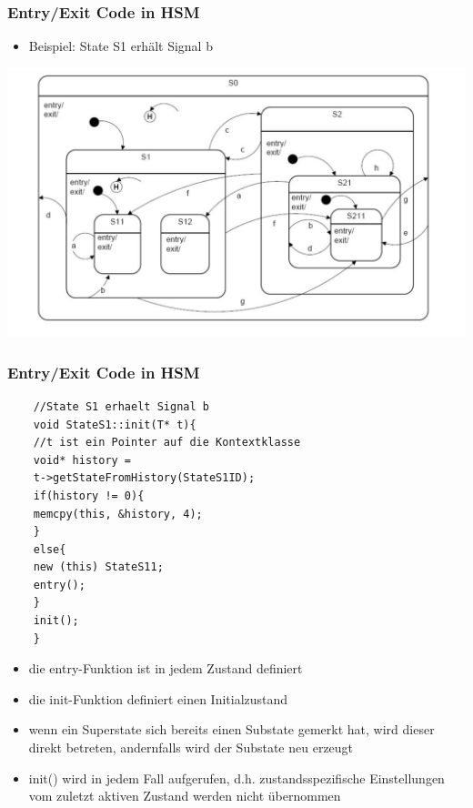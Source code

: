 \documentclass{beamer}
\begin{document}
\begin{frame}
	\frametitle{Entry/Exit Code in HSM  }
	\begin{itemize}
		\item Beispiel: State S1 erh\"alt Signal b
	\end{itemize}
	\includegraphics[scale=.3]{img/beispiel_automat}
\end{frame}

\begin{frame}[fragile]
	\frametitle{Entry/Exit Code in HSM }
	\begin{lstlisting}
	//State S1 erhaelt Signal b
	void StateS1::init(T* t){
	//t ist ein Pointer auf die Kontextklasse
	void* history = 
	t->getStateFromHistory(StateS1ID);
	if(history != 0){
	memcpy(this, &history, 4);
	}
	else{
	new (this) StateS11;
	entry();
	}
	init();
	}
	\end{lstlisting}
\end{frame}

\begin{frame}[fragile]
	\begin{itemize}
		\item die entry-Funktion ist in jedem Zustand definiert
		\item die init-Funktion definiert einen Initialzustand
		\item wenn ein Superstate sich bereits einen Substate gemerkt hat, wird dieser direkt betreten, andernfalls wird der Substate neu erzeugt
		\item init() wird in jedem Fall aufgerufen, d.h. zustandsspezifische Einstellungen vom zuletzt aktiven Zustand werden nicht \"ubernommen
	\end{itemize}
\end{frame}
\end{document}

